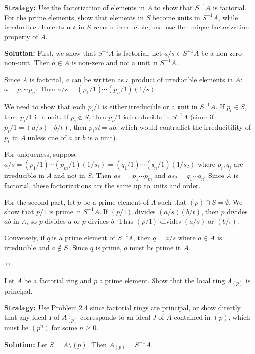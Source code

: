 \noindent\textbf{Strategy:} Use the factorization of elements in $A$ to show that $S^{-1}A$ is factorial. For the prime elements, show that elements in $S$ become units in $S^{-1}A$, while irreducible elements not in $S$ remain irreducible, and use the unique factorization property of $A$.

\noindent\textbf{Solution:}
First, we show that $S^{-1}A$ is factorial. Let $a/s \in S^{-1}A$ be a non-zero non-unit. Then $a \in A$ is non-zero and not a unit in $S^{-1}A$.

Since $A$ is factorial, $a$ can be written as a product of irreducible elements in $A$: $a = p_1 \cdots p_n$. Then $a/s = (p_1/1) \cdots (p_n/1)(1/s)$.

We need to show that each $p_i/1$ is either irreducible or a unit in $S^{-1}A$. If $p_i \in S$, then $p_i/1$ is a unit. If $p_i \notin S$, then $p_i/1$ is irreducible in $S^{-1}A$ (since if $p_i/1 = (a/s)(b/t)$, then $p_i st = ab$, which would contradict the irreducibility of $p_i$ in $A$ unless one of $a$ or $b$ is a unit).

For uniqueness, suppose $a/s = (p_1/1) \cdots (p_m/1)(1/s_1) = (q_1/1) \cdots (q_n/1)(1/s_2)$ where $p_i, q_j$ are irreducible in $A$ and not in $S$. Then $a s_1 = p_1 \cdots p_m$ and $a s_2 = q_1 \cdots q_n$. Since $A$ is factorial, these factorizations are the same up to units and order.

For the second part, let $p$ be a prime element of $A$ such that $(p) \cap S = \emptyset$. We show that $p/1$ is prime in $S^{-1}A$. If $(p/1)$ divides $(a/s)(b/t)$, then $p$ divides $ab$ in $A$, so $p$ divides $a$ or $p$ divides $b$. Thus $(p/1)$ divides $(a/s)$ or $(b/t)$.

Conversely, if $q$ is a prime element of $S^{-1}A$, then $q = a/s$ where $a \in A$ is irreducible and $a \notin S$. Since $q$ is prime, $a$ must be prime in $A$.


\qed
\begin{problembox}
Let $A$ be a factorial ring and $p$ a prime element. Show that the local ring $A_{(p)}$ is principal.
\end{problembox}

\noindent\textbf{Strategy:} Use Problem 2.4 since factorial rings are principal, or show directly that any ideal $I$ of $A_{(p)}$ corresponds to an ideal $J$ of $A$ contained in $(p)$, which must be $(p^n)$ for some $n \geq 0$.

\noindent\textbf{Solution:}
Let $S = A \setminus (p)$. Then $A_{(p)} = S^{-1}A$.

